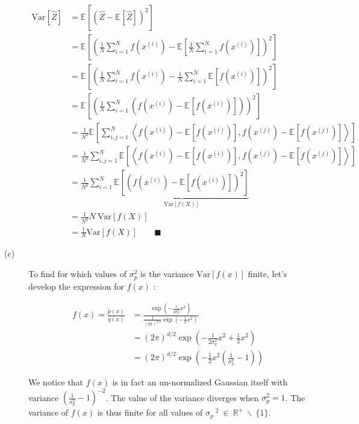 \documentclass[11pt]{article}
\newcommand{\Var}[1]{\mathrm{Var}\!\left[#1 \right]}
\newcommand{\Expect}[2][]{\mathbb{E}_{#1}\!\left[#2 \right]}
\begin{document}
\begin{description}
\begin{align*}
\Var{\hat{Z}} & = \Expect{\left( \hat{Z} - \Expect{\hat{Z}} \right)^2} \\
			  & = \Expect{\left( \frac{1}{N}\sum_{i=1}^{N} f \left(x^{(i)}\right) - \Expect{ \frac{1}{N}\sum_{i=1}^{N} f \left(x^{(i)} \right)} \right)^2} \\
			  & = \Expect{\left( \frac{1}{N}\sum_{i=1}^N f \left( x^{(i)} \right) - \frac{1}{N} \sum_{i=1}^N \Expect{f \left( x^{(i)} \right)} \right)^2} \\
			  & = \Expect{\left( \frac{1}{N} \sum_{i=1}^N \left( f\left( x^{(i)} \right) - \Expect{f\left( x^{(i)} \right)}  \right) \right)^2} \\ 
			  & = \frac{1}{N^2} \Expect{ \sum_{i,j = 1}^N \left\langle f\left( x^{(i)} \right) - \Expect{f\left( x^{(i)} \right)} , f\left( x^{(j)} \right) - \Expect{f\left( x^{(j)} \right)} \right\rangle} \\
			  & = \frac{1}{N^2} \sum_{i,j = 1}^N \Expect{\left\langle f\left( x^{(i)} \right) - \Expect{f\left( x^{(i)} \right)} , f\left( x^{(j)} \right) - \Expect{f\left( x^{(j)} \right)} \right\rangle} \\
			  & = \frac{1}{N^2}\sum_{i = 1}^N \underbrace{\Expect{\left( f\left( x^{(i)} \right) - \Expect{f\left( x^{(i)} \right)} \right)^2}}_{\Var{f\left( X \right)}} \\
			  & = \frac{1}{N^2} N \:\Var{f(X)} \\ 
			  & = \frac{1}{N} \Var{f(X)} \qquad\blacksquare
\end{align*}






\item [(c)] To find for which values of $\sigma_p ^2$ is the variance $\Var{f(x)}$ finite, let's develop the expression for $f(x)$ :

\begin{align*}
f(x)  = \frac{\tilde{p}(x)}{q(x)} & = \frac{\exp \left( - \frac{1}{2\sigma_p ^2} x^2 \right)}{\frac{1}{\left( 2\pi \right)^{d/2}} \exp \left( -\frac{1}{2}x^2 \right)} \\
								  & = \left(2\pi \right)^{d/2} \exp \left( - \frac{1}{2\sigma_p ^2} x^2 + \frac{1}{2}x^2 \right) \\
								  & = \left(2\pi \right)^{d/2} \exp \left( - \frac{1}{2}x^2 \left( \frac{1}{\sigma_p ^2} - 1 \right) \right)
\end{align*}

We notice that $f(x)$ is in fact an un-normalized Gaussian itself with variance $\left( \frac{1}{\sigma_p ^2} - 1 \right)^{-2}$. The value of the variance diverges when $\sigma_p ^2 = 1$. The variance of $f(x)$ is thus finite for all values of $\sigma_p~^2~\in~\mathbb{R}^+~\backslash~\{1\}$.





\end{description}
\clearpage
\end{document}
